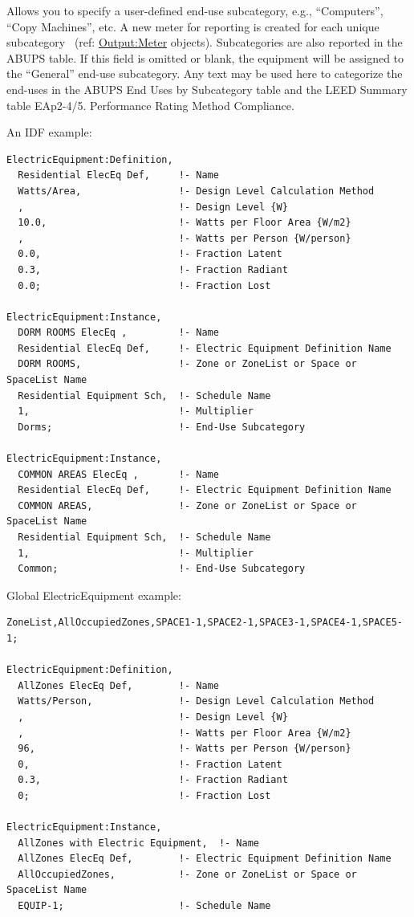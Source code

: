 Allows you to specify a user-defined end-use subcategory, e.g., ``Computers'', ``Copy Machines'', etc. A new meter for reporting is created for each unique subcategory~ (ref: \hyperref[outputmeter-and-outputmetermeterfileonly]{Output:Meter} objects). Subcategories are also reported in the ABUPS table. If this field is omitted or blank, the equipment will be assigned to the ``General'' end-use subcategory. Any text may be used here to categorize the end-uses in the ABUPS End Uses by Subcategory table and the LEED Summary table EAp2-4/5. Performance Rating Method Compliance.

An IDF example:

\begin{lstlisting}
ElectricEquipment:Definition,
  Residential ElecEq Def,     !- Name
  Watts/Area,                 !- Design Level Calculation Method
  ,                           !- Design Level {W}
  10.0,                       !- Watts per Floor Area {W/m2}
  ,                           !- Watts per Person {W/person}
  0.0,                        !- Fraction Latent
  0.3,                        !- Fraction Radiant
  0.0;                        !- Fraction Lost

ElectricEquipment:Instance,
  DORM ROOMS ElecEq ,         !- Name
  Residential ElecEq Def,     !- Electric Equipment Definition Name
  DORM ROOMS,                 !- Zone or ZoneList or Space or SpaceList Name
  Residential Equipment Sch,  !- Schedule Name
  1,                          !- Multiplier
  Dorms;                      !- End-Use Subcategory

ElectricEquipment:Instance,
  COMMON AREAS ElecEq ,       !- Name
  Residential ElecEq Def,     !- Electric Equipment Definition Name
  COMMON AREAS,               !- Zone or ZoneList or Space or SpaceList Name
  Residential Equipment Sch,  !- Schedule Name
  1,                          !- Multiplier
  Common;                     !- End-Use Subcategory
\end{lstlisting}

Global ElectricEquipment example:

\begin{lstlisting}
ZoneList,AllOccupiedZones,SPACE1-1,SPACE2-1,SPACE3-1,SPACE4-1,SPACE5-1;

ElectricEquipment:Definition,
  AllZones ElecEq Def,        !- Name
  Watts/Person,               !- Design Level Calculation Method
  ,                           !- Design Level {W}
  ,                           !- Watts per Floor Area {W/m2}
  96,                         !- Watts per Person {W/person}
  0,                          !- Fraction Latent
  0.3,                        !- Fraction Radiant
  0;                          !- Fraction Lost

ElectricEquipment:Instance,
  AllZones with Electric Equipment,  !- Name
  AllZones ElecEq Def,        !- Electric Equipment Definition Name
  AllOccupiedZones,           !- Zone or ZoneList or Space or SpaceList Name
  EQUIP-1;                    !- Schedule Name
\end{lstlisting}

